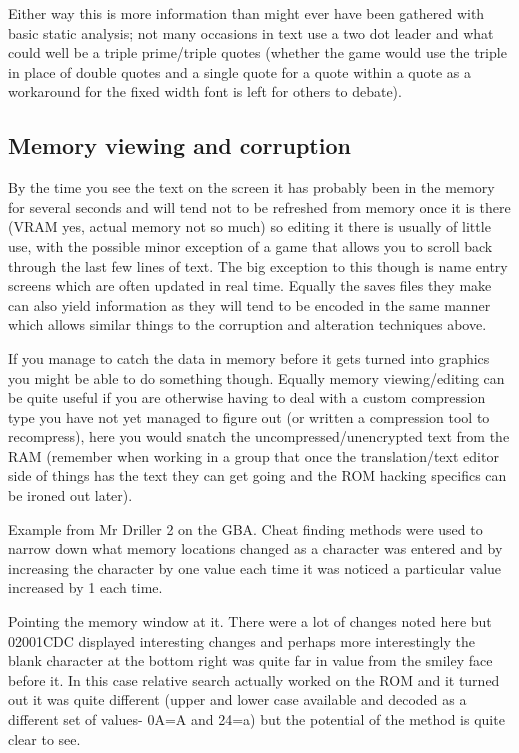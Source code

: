 \documentclass[
]{book}
\begin{document}
Either way this is more information than might ever have been gathered with basic static analysis; not many occasions in text use a two dot leader and what could well be a triple prime/triple quotes (whether the game would use the triple in place of double quotes and a single quote for a quote within a quote as a workaround for the fixed width font is left for others to debate).

\hypertarget{memory-viewing-and-corruption}{%
\subsection{Memory viewing and corruption}\label{memory-viewing-and-corruption}}

By the time you see the text on the screen it has probably been in the memory for several seconds and will tend not to be refreshed from memory once it is there (VRAM yes, actual memory not so much) so editing it there is usually of little use, with the possible minor exception of a game that allows you to scroll back through the last few lines of text. The big exception to this though is name entry screens which are often updated in real time. Equally the saves files they make can also yield information as they will tend to be encoded in the same manner which allows similar things to the corruption and alteration techniques above.

If you manage to catch the data in memory before it gets turned into graphics you might be able to do something though. Equally memory viewing/editing can be quite useful if you are otherwise having to deal with a custom compression type you have not yet managed to figure out (or written a compression tool to recompress), here you would snatch the uncompressed/unencrypted text from the RAM (remember when working in a group that once the translation/text editor side of things has the text they can get going and the ROM hacking specifics can be ironed out later).

Example from Mr Driller 2 on the GBA. Cheat finding methods were used to narrow down what memory locations changed as a character was entered and by increasing the character by one value each time it was noticed a particular value increased by 1 each time.

Pointing the memory window at it. There were a lot of changes noted here but 02001CDC displayed interesting changes and perhaps more interestingly the blank character at the bottom right was quite far in value from the smiley face before it. In this case relative search actually worked on the ROM and it turned out it was quite different (upper and lower case available and decoded as a different set of values- 0A=A and 24=a) but the potential of the method is quite clear to see.
\end{document}
